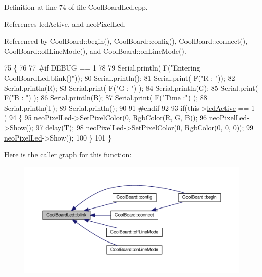 Definition at line 74 of file Cool\+Board\+Led.\+cpp.



References led\+Active, and neo\+Pixel\+Led.



Referenced by Cool\+Board\+::begin(), Cool\+Board\+::config(), Cool\+Board\+::connect(), Cool\+Board\+::off\+Line\+Mode(), and Cool\+Board\+::on\+Line\+Mode().


\begin{DoxyCode}
75 \{
76 
77 \textcolor{preprocessor}{#if DEBUG == 1}
78 
79     Serial.println( F(\textcolor{stringliteral}{"Entering CoolBoardLed.blink()"}));
80     Serial.println();
81     Serial.print( F(\textcolor{stringliteral}{"R : "}));
82     Serial.println(R);
83     Serial.print( F(\textcolor{stringliteral}{"G : "}) );
84     Serial.println(G);
85     Serial.print( F(\textcolor{stringliteral}{"B : "}) );
86     Serial.println(B);
87     Serial.print( F(\textcolor{stringliteral}{"Time :"}) );
88     Serial.println(T);
89     Serial.println();
90 
91 \textcolor{preprocessor}{#endif  }
92 
93     \textcolor{keywordflow}{if}(this->\hyperlink{classCoolBoardLed_a5f17c135516fcf4b44ea8a096ba0177a}{ledActive} == 1 )
94     \{
95         \hyperlink{classCoolBoardLed_ac2c13fa462a010cd9242bf297c013923}{neoPixelLed}->SetPixelColor(0, RgbColor(R, G, B));
96         \hyperlink{classCoolBoardLed_ac2c13fa462a010cd9242bf297c013923}{neoPixelLed}->Show();
97         delay(T);
98         \hyperlink{classCoolBoardLed_ac2c13fa462a010cd9242bf297c013923}{neoPixelLed}->SetPixelColor(0, RgbColor(0, 0, 0));
99         \hyperlink{classCoolBoardLed_ac2c13fa462a010cd9242bf297c013923}{neoPixelLed}->Show();
100     \}
101 \}
\end{DoxyCode}
Here is the caller graph for this function\+:\nopagebreak
\begin{figure}[H]
\begin{center}
\leavevmode
\includegraphics[width=350pt]{classCoolBoardLed_a96e1ea13003eee34c9dbcef340404426_icgraph}
\end{center}
\end{figure}
\mbox{\label{classCoolBoardLed_a1b60e5e30bea96c49ed62ed1bf1ffc8b}} 
